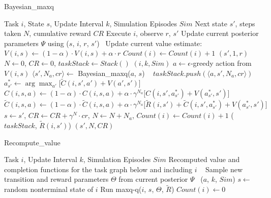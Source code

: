 \begin{algorithm}[t]
\caption{{\sc Bayesian\_maxq}} \label{alg:bmaxq}
\begin{algorithmic}[1]
\REQUIRE Task $i$, State $s$, Update Interval $k$, Simulation Episodes $Sim$
\ENSURE Next state $s'$, steps taken $N$, cumulative reward $CR$
\STATE Execute $i$, observe $r$, $s'$
\STATE Update current posterior parameters $\Psi$ using ($s$, $i$, $r$, $s'$)~\label{line:update}
\STATE Update current value estimate: $V(i,s) \leftarrow (1-\alpha)\cdot V(i,s)+\alpha\cdot r$
\STATE $Count(i) \leftarrow Count(i)+1$
\RETURN $(s', 1, r)$
\ELSE               %
\STATE $N \leftarrow 0$, $CR \leftarrow 0$, $taskStack \leftarrow Stack()$
$(i, k, Sim)$
\STATE $a\leftarrow \epsilon$-greedy action from $V(i, s)$
\STATE $\langle s', N_a, cr\rangle \leftarrow$ {\sc Bayesian\_maxq}($a$, $s$) ~\label{line:recursive}
\STATE $taskStack.push(\langle a, s', N_a, cr \rangle)$    
\STATE $a^*_{s'}\leftarrow \arg\max_{a'}\bigl[\tilde{C}(i,s',a')+V(a',s')\bigr]$ ~\label{line:comp1}
\STATE $C(i,s,a)\leftarrow(1-\alpha)\cdot C(i,s,a) + \alpha\cdot \gamma^{N_a}\bigl[C(i,s',a^*_{s'})+V(a^*_{s'},s') \bigr]$~\label{line:comp2}
\STATE $\tilde{C}(i,s,a)\leftarrow(1-\alpha)\cdot \tilde{C}(i,s,a) + \alpha\cdot \gamma^{N_a}\bigl[\tilde{R}(i, s')+\tilde{C}(i,s',a^*_{s'})+V(a^*_{s'},s') \bigr]$
\STATE $s\leftarrow s'$, $CR \leftarrow CR+\gamma^N\cdot cr$, $N\leftarrow N+N_a$, $Count(i) \leftarrow Count(i)+1$
\ENDWHILE
{}($taskStack$, $\tilde{R}(i, s')$)
\RETURN $(s', N, CR)$
\ENDIF
\end{algorithmic}
\end{algorithm} 


\begin{algorithm}[t]
\caption{{\sc Recompute\_value}} \label{alg:recompvalue}
\begin{algorithmic}[1]
\REQUIRE Task $i$, Update Interval $k$, Simulation Episodes $Sim$
\ENSURE Recomputed value and completion functions for the task graph below and including $i$
\RETURN~\label{line:checkk}
\ENDIF
{}  
\STATE Sample new transition and reward parameters $\Theta$ from
current posterior $\Psi$~\label{line:sample}
\ELSE
{}
($a$, $k$, $Sim$)
\ENDFOR
{}
\STATE $s \leftarrow$ random nonterminal state of $i$
\STATE Run {\sc maxq-q}($i$, $s$, $\Theta$, $\tilde{R}$) %
\ENDFOR
\ENDIF
\STATE $Count(i) \leftarrow 0$
\end{algorithmic}
\end{algorithm} 

